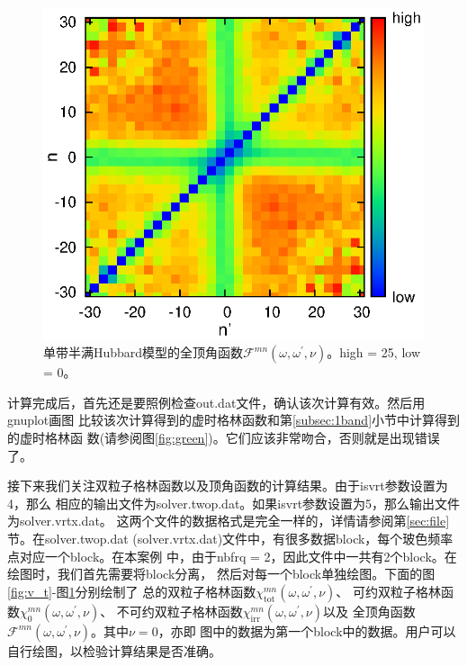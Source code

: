 \begin{figure}
\centering
\includegraphics[scale=1.05]{figure/v_g.eps}
\caption[全顶角函数$\mathcal{F}^{mn}(\omega,\omega^{\prime},\nu)$]
{单带半满Hubbard模型的全顶角函数$\mathcal{F}^{mn}(\omega,\omega^{\prime},\nu)$。high = 25, low = 0。} 
\label{fig:v_g}
\end{figure}

计算完成后，首先还是要照例检查out.dat文件，确认该次计算有效。然后用gnuplot画图
比较该次计算得到的虚时格林函数和第\ref{subsec:1band}小节中计算得到的虚时格林函
数(请参阅图\ref{fig:green})。它们应该非常吻合，否则就是出现错误了。

接下来我们关注双粒子格林函数以及顶角函数的计算结果。由于isvrt参数设置为4，那么
相应的输出文件为solver.twop.dat。如果isvrt参数设置为5，那么输出文件为solver.vrtx.dat。
这两个文件的数据格式是完全一样的，详情请参阅第\ref{sec:file}节。在solver.twop.dat
(solver.vrtx.dat)文件中，有很多数据block，每个玻色频率点对应一个block。在本案例
中，由于nbfrq = 2，因此文件中一共有2个block。在绘图时，我们首先需要将block分离，
然后对每一个block单独绘图。下面的图\ref{fig:v_t}-图\ref{fig:v_g}分别绘制了
总的双粒子格林函数$\chi^{mn}_{\text{tot}}(\omega,\omega^{\prime},\nu)$、
可约双粒子格林函数$\chi^{mn}_{0}(\omega,\omega^{\prime},\nu)$、
不可约双粒子格林函数$\chi^{mn}_{\text{irr}}(\omega,\omega^{\prime},\nu)$以及
全顶角函数$\mathcal{F}^{mn}(\omega,\omega^{\prime},\nu)$。其中$\nu = 0$，亦即
图中的数据为第一个block中的数据。用户可以自行绘图，以检验计算结果是否准确。

